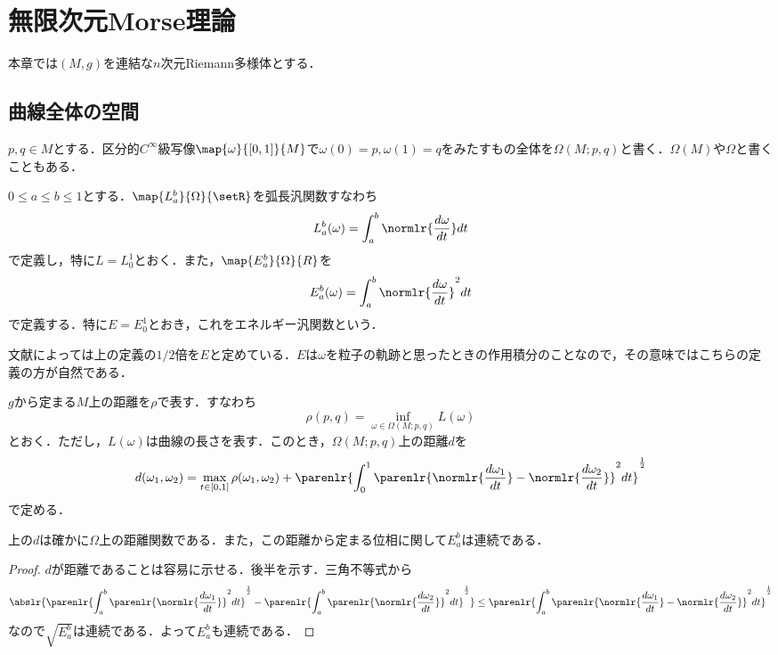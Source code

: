 \documentclass[uplatex]{jsarticle}
\begin{document}
\section{無限次元Morse理論}
本章では$(M,g)$を連結な$n$次元Riemann多様体とする．
\subsection{曲線全体の空間}

\begin{definition}
$p,q \in M$とする．区分的$C^{\infty}$級写像$\map{\omega}{[0,1]}{M}$で$\omega(0) = p,\omega(1) = q$をみたすもの全体を$\Omega(M;p,q)$と書く．$\Omega(M)$や$\Omega$と書くこともある．
\end{definition}

\begin{definition}
$0\leq a \leq b\leq 1$とする．$\map{L_a^b}{\Omega}{\setR}$を弧長汎関数すなわち
\[ L_a^b(\omega) = \int_a^b \normlr{\frac{d\omega}{dt}}dt \]
で定義し，特に$L=L_0^1$とおく．また，$\map{E_a^b}{\Omega}{R}$を
\[ E_a^b(\omega) = \int_a^b \normlr{\frac{d\omega}{dt}}^2 dt \]
で定義する．特に$E = E_0^1$とおき，これをエネルギー汎関数という．
\end{definition}

\begin{remark}
文献によっては上の定義の$1/2$倍を$E$と定めている．$E$は$\omega$を粒子の軌跡と思ったときの作用積分のことなので，その意味ではこちらの定義の方が自然である．
\end{remark}

\begin{definition}
$g$から定まる$M$上の距離を$\rho$で表す．すなわち
\[ \rho(p,q) = \inf_{\omega \in \Omega(M;p,q)} L(\omega) \]
とおく．ただし，$L(\omega)$は曲線の長さを表す．このとき，$\Omega(M;p,q)$上の距離$d$を
\[ d(\omega_1, \omega_2) = \max_{t\in [0,1]} \rho(\omega_1, \omega_2)+\parenlr{\int_0^1 \parenlr{\normlr{\frac{d\omega_1}{dt}}-\normlr{\frac{d\omega_2}{dt}}}^2 dt }^{\frac{1}{2}} \]
で定める．
\end{definition}

\begin{proposition}
上の$d$は確かに$\Omega$上の距離関数である．また，この距離から定まる位相に関して$E_a^b$は連続である．
\end{proposition}
\begin{proof}
$d$が距離であることは容易に示せる．後半を示す．三角不等式から
\[\abslr{\parenlr{\int_a^b \parenlr{\normlr{\frac{d\omega_1}{dt}}}^2 dt }^{\frac{1}{2}} - \parenlr{\int_a^b \parenlr{\normlr{\frac{d\omega_2}{dt}}}^2 dt }^{\frac{1}{2}}}\leq \parenlr{\int_a^b \parenlr{\normlr{\frac{d\omega_1}{dt}}-\normlr{\frac{d\omega_2}{dt}}}^2 dt }^{\frac{1}{2}} \]
なので$\sqrt{E_a^b}$は連続である．よって$E_a^b$も連続である．
\end{proof}
\end{document}
